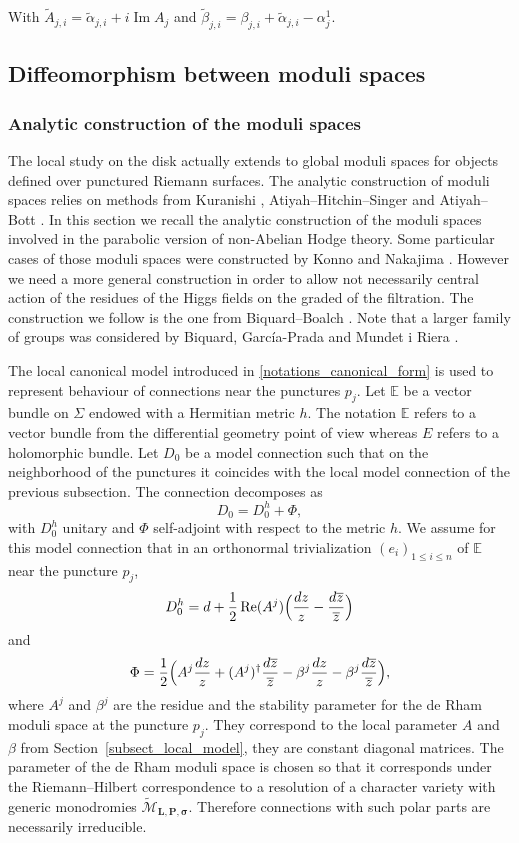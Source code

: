 \documentclass[11pt]{article}
\newcommand{\Subsection}{\subsection}
\theoremstyle{definition}
\theoremstyle{plain}
\DeclareMathOperator{\Imm}{Im}
\DeclareMathOperator{\Ree}{Re}
\newcommand{\zbar}{\overline{z}}
\newcommand{\mlps}{\widetilde{\mathcal{M}}_{\boldsymbol{L},\boldsymbol{P},\boldsymbol{\sigma}}}
\begin{document}
With $\widetilde{A}_{j,i}= \widetilde{\alpha}_{j,i}+ i \Imm A_j$ and $\widetilde{\beta}_{j,i}=\beta_{j,i}+\widetilde{\alpha}_{j,i}-\alpha^1_j$.

\Subsection{Diffeomorphism between moduli spaces}\label{sect_diffeo_ms}
\subsubsection{Analytic construction of the moduli spaces}\label{sect_global_moduli}
The local study on the disk actually extends to global moduli spaces for objects defined over punctured Riemann surfaces. The analytic construction of moduli spaces relies on methods from Kuranishi \cite{Kuranishi}, Atiyah--Hitchin--Singer \cite{Atiyah_Hitchin_Singer} and Atiyah--Bott \cite{Atiyah_Bott}. In this section we recall the analytic construction of the moduli spaces involved in the parabolic version of non-Abelian Hodge theory. Some particular cases of those moduli spaces were constructed by Konno \cite{Konno} and Nakajima \cite{Nakajima_1996}. However we need a more general construction in order to allow not necessarily central action of the residues of the Higgs fields on the graded of the filtration. The construction we follow is the one from Biquard--Boalch \cite{Biquard_Boalch_2004}. Note that a larger family of groups was considered by Biquard, García-Prada and Mundet i Riera \cite{Biquard_Garcia_Prada_Riera}.

The local canonical model introduced in \ref{notations_canonical_form} is used to represent behaviour of connections near the punctures $p_j$. Let $\mathbb{E}$ be a vector bundle on $\Sigma$ endowed with a Hermitian metric $h$. The notation $\mathbb{E}$ refers to a vector bundle from the differential geometry point of view whereas $E$ refers to a holomorphic bundle. Let $D_0$ be a model connection such that on the neighborhood of the punctures it coincides with the local model connection of the previous subsection. The connection decomposes as
\[
D_0 = D_0^h + \Phi,
\]
with $D_0^h$ unitary and $\Phi$ self-adjoint with respect to the metric $h$. We assume for this model connection that in an orthonormal trivialization $(e_i)_{1\le i \le n}$ of $\mathbb{E}$ near the puncture $p_j$,
\[
D^h_0 = d + \frac{1}{2} \Ree(A^j) \Bigl(\frac{d z}{z} - \frac{d \zbar}{\zbar}\Bigr)
\]
and
\[
\Phi = \frac{1}{2} \Bigl(A^j\frac{d z}{z} + (A^j)^{\dagger}\frac{d\overline{z}}{\overline{z}} - \beta^j \frac{d z}{z} - \beta^j \frac{d \overline{z}}{\overline{z}}\Bigr),
\]
where $A^j$ and $\beta^j$ are the residue and the stability parameter for the de Rham moduli space at the puncture $p_j$. They correspond to the local parameter $A$ and $\beta$ from Section~\ref{subsect_local_model}, they are constant diagonal matrices. The parameter of the de Rham moduli space is chosen so that it corresponds under the Riemann--Hilbert correspondence to a resolution of a character variety with generic monodromies $\mlps$. Therefore connections with such polar parts are necessarily irreducible.
\end{document}
